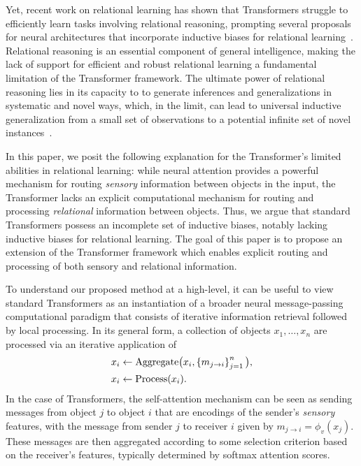 Yet, recent work on relational learning has shown that Transformers struggle to efficiently learn tasks involving relational reasoning, prompting several proposals for neural architectures that incorporate inductive biases for relational learning~\citep{santoroSimpleNeuralNetwork2017,santoroRelationalRecurrentNeural2018,shanahanExplicitlyRelationalNeurala,webbEmergentSymbolsBinding2021,webbRelationalBottleneckInductive2024,kergNeuralArchitectureInductive2022,altabaa2024abstractors,altabaaLearningHierarchicalRelational2024}. Relational reasoning is an essential component of general intelligence, making the lack of support for efficient and robust relational learning a fundamental limitation of the Transformer framework. The ultimate power of relational reasoning lies in its capacity to to generate inferences and generalizations in systematic and novel ways, which, in the limit, can lead to universal inductive generalization from a small set of observations to a potential infinite set of novel instances~\citep{goyal2022inductive}.

In this paper, we posit the following explanation for the Transformer's limited abilities in relational learning: while neural attention provides a powerful mechanism for routing \textit{sensory} information between objects in the input, the Transformer lacks an explicit computational mechanism for routing and processing \textit{relational} information between objects. Thus, we argue that standard Transformers possess an incomplete set of inductive biases, notably lacking inductive biases for relational learning. The goal of this paper is to propose an extension of the Transformer framework which enables explicit routing and processing of both sensory and relational information.

To understand our proposed method at a high-level, it can be useful to view standard Transformers as an instantiation of a broader neural message-passing computational paradigm that consists of iterative information retrieval followed by local processing. In its general form, a collection of objects $x_1,\ldots, x_n$ are processed via an iterative application of
\begin{equation}\label{eq:intro_message_passing}
  \begin{split}
    x_i &\gets \mathrm{Aggregate}\big(x_i, \left\{m_{j \to i}\right\}_{j=1}^{n}\big), \\
    x_i &\gets \mathrm{Process}(x_i).
  \end{split}
\end{equation}
In the case of Transformers, the self-attention mechanism can be seen as sending messages from object $j$ to object $i$ that are encodings of the sender's \textit{sensory} features, with the message from sender $j$ to receiver $i$ given by $m_{j \to i} = \phi_v(x_j)$. These messages are then aggregated according to some selection criterion based on the receiver's features,  typically determined by softmax attention scores. 

